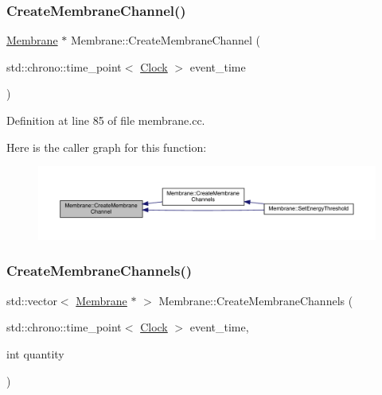 \subsubsection{\texorpdfstring{Create\+Membrane\+Channel()}{CreateMembraneChannel()}}
{\footnotesize\ttfamily \hyperlink{class_membrane}{Membrane} $\ast$ Membrane\+::\+Create\+Membrane\+Channel (\begin{DoxyParamCaption}\item[{std\+::chrono\+::time\+\_\+point$<$ \hyperlink{universe_8h_a0ef8d951d1ca5ab3cfaf7ab4c7a6fd80}{Clock} $>$}]{event\+\_\+time }\end{DoxyParamCaption})}



Definition at line 85 of file membrane.\+cc.

Here is the caller graph for this function\+:
\nopagebreak
\begin{figure}[H]
\begin{center}
\leavevmode
\includegraphics[width=350pt]{class_membrane_a589b56529ac634a52b2a5fc78d356973_icgraph}
\end{center}
\end{figure}
\mbox{\label{class_membrane_a72987fae41e552af5befcd9a62aa6e46}} 
\subsubsection{\texorpdfstring{Create\+Membrane\+Channels()}{CreateMembraneChannels()}}
{\footnotesize\ttfamily std\+::vector$<$ \hyperlink{class_membrane}{Membrane} $\ast$ $>$ Membrane\+::\+Create\+Membrane\+Channels (\begin{DoxyParamCaption}\item[{std\+::chrono\+::time\+\_\+point$<$ \hyperlink{universe_8h_a0ef8d951d1ca5ab3cfaf7ab4c7a6fd80}{Clock} $>$}]{event\+\_\+time,  }\item[{int}]{quantity }\end{DoxyParamCaption})}



